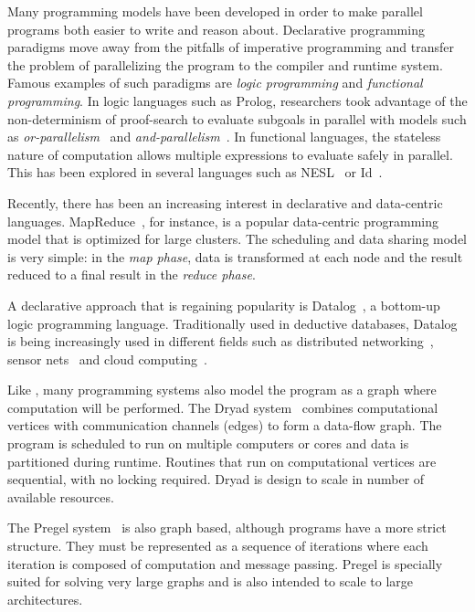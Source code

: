 
Many programming models have been developed in order to make parallel programs both easier to write and reason about. 
Declarative programming paradigms move away from the pitfalls of imperative programming and transfer the problem of parallelizing
the program to the compiler and runtime system. Famous examples of such paradigms are \emph{logic programming} and \emph{functional programming}.
In logic languages such as Prolog, researchers took advantage of the non-determinism of proof-search to evaluate subgoals
in parallel with models such as \emph{or-parallelism}~\cite{ali-86} and \emph{and-parallelism}~\cite{Shen-92}.
In functional languages, the stateless nature of computation allows multiple expressions to evaluate safely in parallel.
This has been explored in several languages such as NESL~\cite{Blelloch:1996:PPA:227234.227246} or Id~\cite{Nikhil93anoverview}.

Recently, there has been an increasing interest in declarative and data-centric languages.
MapReduce~\cite{Dean:2008:MSD:1327452.1327492}, for instance, is a popular data-centric programming
model that is optimized for large clusters. The scheduling and data sharing model is very simple:
in the \emph{map phase}, data is transformed at each node and the result reduced to a final
result in the \emph{reduce phase}.

A declarative approach that is regaining popularity is Datalog~\cite{Ullman:1990:PDK:533142}, a
bottom-up logic programming language.
Traditionally used in deductive databases, Datalog is being increasingly used in different fields
such as distributed networking~\cite{Loo-condie-garofalakis-p2}, sensor
nets~\cite{Chu:2007:DID:1322263.1322281} and cloud computing~\cite{alvaro:boom}.

Like \lang, many programming systems also model the program as a graph where computation will be performed.
The Dryad system~\cite{Isard:2007:DDD:1272996.1273005} combines computational vertices
with communication channels (edges) to form a data-flow graph. The program is scheduled to
run on multiple computers or cores and data is partitioned during runtime. Routines that run on computational vertices
are sequential, with no locking required. Dryad is design to scale in number of available resources.

The Pregel system~\cite{Malewicz:2010:PSL:1807167.1807184} is also graph based, although programs have a more strict
structure. They must be represented as a sequence of iterations where each iteration is composed of computation and message passing.
Pregel is specially suited for solving very large graphs
and is also intended to scale to large architectures.

